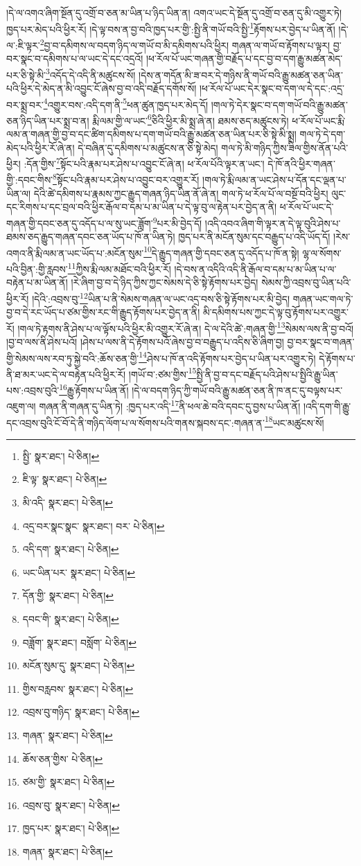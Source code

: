 །དེ་ལ་འགའ་ཞིག་སྔོན་དུ་འགྲོ་བ་ཅན་མ་ཡིན་པ་ཉིད་ཡིན་ན། འགའ་ཡང་དེ་སྔོན་དུ་འགྲོ་བ་ཅན་དུ་མི་འགྱུར་ཏེ། ཁྱད་པར་མེད་པའི་ཕྱིར་རོ། །དེ་ལྟ་བས་ན་བྱ་བའི་ཁྱད་པར་གྱི་:སྤྱི་ནི་གཡོ་བའི་སྤྱི་\footnote{སྤྱི་  སྣར་ཐང་།  པེ་ཅིན། }རྟོགས་པར་བྱེད་པ་ཡིན་ནོ། །དེ་ལ་:ཇི་ལྟར་\footnote{ཇི་ལྟ་  སྣར་ཐང་།  པེ་ཅིན། }བྱ་བ་དམིགས་ལ་བདག་ཉིད་ལ་གཡོ་བ་མི་དམིགས་པའི་ཕྱིར། གཞན་ལ་གཡོ་བ་རྟོགས་པ་ལྟར། བྱ་བར་སྣང་བ་དམིགས་པ་ལ་ཡང་དེ་དང་འདྲའོ། །ཕ་རོལ་པོ་ཡང་གཞན་གྱི་བརྗོད་པ་དང་བྱ་བ་དག་རྒྱུ་མཚན་མེད་པར་ཅི་སྟེ་མི་\footnote{མི་འདི་  སྣར་ཐང་།  པེ་ཅིན། }འདོད་དེ་འདི་ནི་མཚུངས་སོ། །དེས་ན་གདོན་མི་ཟ་བར་དེ་གཉིས་ནི་གཡོ་བའི་རྒྱུ་མཚན་ཅན་ཡིན་པའི་ཕྱིར་དེ་མེད་ན་མི་འབྱུང་ངོ་ཞེས་བྱ་བ་འདི་བརྗོད་དགོས་སོ། །ཕ་རོལ་པོ་ཡང་དེར་སྣང་བ་དག་ལ་དེ་དང་:འདྲ་བར་སྨྲ་བར་\footnote{འདྲ་བར་སྣང་སྣང་  སྣར་ཐང་། བར་  པེ་ཅིན། }འགྱུར་བས་:འདི་དག་ནི་\footnote{འདི་དག་  སྣར་ཐང་།  པེ་ཅིན། }ཕན་ཚུན་ཁྱད་པར་མེད་དོ། །གལ་ཏེ་དེར་སྣང་བ་དག་གཡོ་བའི་རྒྱུ་མཚན་ཅན་ཉིད་ཡིན་པར་སྨྲ་བ་ན། རྨི་ལམ་གྱི་ལ་ཡང་\footnote{ཡང་ཡིན་པར་  སྣར་ཐང་།  པེ་ཅིན། }ཅིའི་ཕྱིར་མི་སྨྲ་ཞེ་ན། ཐམས་ཅད་མཚུངས་ཏེ། ཕ་རོལ་པོ་ཡང་རྨི་ལམ་ན་གཞན་གྱི་བྱ་བ་དང་ཚིག་དམིགས་པ་དག་གཡོ་བའི་རྒྱུ་མཚན་ཅན་ཡིན་པར་ཅི་སྟེ་མི་སྨྲ། གལ་ཏེ་དེ་དག་མེད་པའི་ཕྱིར་རོ་ཞེ་ན། དེ་བཞིན་དུ་དམིགས་པ་མཚུངས་ན་ཅི་སྟེ་མེད། གལ་ཏེ་མི་གཉིད་ཀྱིས་ཟིལ་གྱིས་ནོན་པའི་ཕྱིར། :དོན་གྱིས་\footnote{དོན་གྱི་  སྣར་ཐང་།  པེ་ཅིན། }སྟོང་པའི་རྣམ་པར་ཤེས་པ་འབྱུང་ངོ་ཞེ་ན། ཕ་རོལ་པོའི་ལྟར་ན་ཡང་། དེ་ཁོ་ནའི་ཕྱིར་གཞན་གྱི་:དབང་གིས་\footnote{དབང་གི་  སྣར་ཐང་།  པེ་ཅིན། }སྟོང་པའི་རྣམ་པར་ཤེས་པ་འབྱུང་བར་འགྱུར་རོ། །གལ་ཏེ་རྨི་ལམ་ན་ཡང་ཤེས་པ་དོན་དང་ལྡན་པ་ཡིན་ལ། དེའི་ཚེ་དམིགས་པ་རྣམས་ཀྱང་རྒྱུད་གཞན་ཉིད་ཡིན་ནོ་ཞེ་ན། གལ་ཏེ་ཕ་རོལ་པོ་ལ་བསྔོ་བའི་ཕྱིར། ལུང་དང་རིགས་པ་དང་བྲལ་བའི་ཕྱིར་རྒོལ་བ་དམ་པ་མ་ཡིན་པ་དེ་ལྟ་བུ་ལ་རྟེན་པར་བྱེད་ན་ནི། ཕ་རོལ་པོ་ཡང་དེ་གཞན་གྱི་དབང་ཅན་དུ་འདོད་པ་ལ་སུ་ཡང་ཟློག་\footnote{བཟློག་  སྣར་ཐང་། བསློག་  པེ་ཅིན། }པར་མི་བྱེད་དོ། །འདི་འབའ་ཞིག་གི་ལྟར་ན་དེ་ལྟ་བུའི་ཤེས་པ་ཐམས་ཅད་རྒྱུད་གཞན་དབང་ཅན་ཡོད་པ་ཁོ་ན་ཡིན་ཏེ། ཁྱད་པར་ནི་མངོན་སུམ་དང་བརྒྱུད་པ་འདི་ཡོད་དོ། །རེས་འགའ་ནི་རྨི་ལམ་ན་ཡང་ཡོད་པ་:མངོན་སུམ་\footnote{མངོན་སུམ་དུ་  སྣར་ཐང་།  པེ་ཅིན། }དེ་རྒྱུད་གཞན་གྱི་དབང་ཅན་དུ་འདོད་པ་ཁོ་ན་སྟེ། ལྷ་ལ་སོགས་པའི་བྱིན་:གྱི་རླབས་\footnote{གྱིས་བརླབས་  སྣར་ཐང་།  པེ་ཅིན། }ཀྱིས་རྨི་ལམ་མཐོང་བའི་ཕྱིར་རོ། །དེ་བས་ན་འདིའི་འདི་ནི་རྒོལ་བ་དམ་པ་མ་ཡིན་པ་ལ་བརྟེན་པ་མ་ཡིན་ནོ། །རེ་ཞིག་བྱ་བ་དེ་ཉིད་ཀྱིས་ཀྱང་སེམས་དེ་ཅི་སྟེ་རྟོགས་པར་བྱེད། སེམས་ཀྱི་འབྲས་བུ་ཡིན་པའི་ཕྱིར་རོ། །དེའི་:འབྲས་བུ་\footnote{འབྲས་བུ་གཉིད་  སྣར་ཐང་།  པེ་ཅིན། }ཡིན་པ་ནི་སེམས་གཞན་ལ་ཡང་འདྲ་བས་ཅི་སྟེ་རྟོགས་པར་མི་བྱེད། གཞན་ཡང་གལ་ཏེ་བྱ་བ་དེ་རང་ཡོད་པ་ཙམ་གྱིས་རང་གི་རྒྱུད་རྟོགས་པར་བྱེད་ན་ནི། མི་དམིགས་པས་ཀྱང་དེ་ལྟ་བུ་རྟོགས་པར་འགྱུར་རོ། །གལ་ཏེ་རྟགས་ནི་ཤེས་པ་ལ་ལྟོས་པའི་ཕྱིར་མི་འགྱུར་རོ་ཞེ་ན། དེ་ལ་དེའི་ཚེ་:གཞན་གྱི་\footnote{གཞན་  སྣར་ཐང་།  པེ་ཅིན། }སེམས་ལས་ནི་བྱ་བའོ། །བྱ་བ་ལས་ནི་ཤེས་པའོ། །ཤེས་པ་ལས་ནི་དེ་རྟོགས་པའོ་ཞེས་བྱ་བ་བརྒྱུད་པ་འདིས་ཅི་ཞིག་བྱ། བྱ་བར་སྣང་བ་གཞན་གྱི་སེམས་ལས་རབ་ཏུ་སྐྱེ་བའི་:ཆོས་ཅན་གྱི་\footnote{ཆོས་ཅན་གྱིས་  པེ་ཅིན། }ཤེས་པ་ཁོ་ན་འདི་རྟོགས་པར་བྱེད་པ་ཡིན་པར་འགྱུར་ཏེ། དེ་རྟོགས་པ་ནི་ཐ་མར་ཡང་དེ་ལ་བརྟེན་པའི་ཕྱིར་རོ། །གཡོ་བ་:ཙམ་གྱིས་\footnote{ཙམ་གྱི་  སྣར་ཐང་།  པེ་ཅིན། }སྤྱི་ནི་བྱ་བ་དང་བརྗོད་པའི་ཤེས་པ་སྤྱིའི་རྒྱུ་ཡིན་པས་:འབྲས་བུའི་\footnote{འབྲས་བུ་  སྣར་ཐང་།  པེ་ཅིན། }རྒྱུ་རྟོགས་པ་ཡིན་ནོ། །དེ་ལ་བདག་ཉིད་ཀྱི་གཡོ་བའི་རྒྱུ་མཚན་ཅན་ནི་ཁ་ནང་དུ་བལྟས་པར་འཇུག་ལ། གཞན་ནི་གཞན་དུ་ཡིན་ཏེ། :ཁྱད་པར་འདི་\footnote{ཁྱད་པར་  སྣར་ཐང་།  པེ་ཅིན། }ནི་ཕལ་ཆེ་བའི་དབང་དུ་བྱས་པ་ཡིན་ནོ། །འདི་དག་གི་རྒྱུ་དང་འབྲས་བུའི་ངོ་བོ་དེ་ནི་གཉིད་ལོག་པ་ལ་སོགས་པའི་གནས་སྐབས་དང་:གཞན་ན་\footnote{གཞན་  སྣར་ཐང་།  པེ་ཅིན། }ཡང་མཚུངས་སོ། 